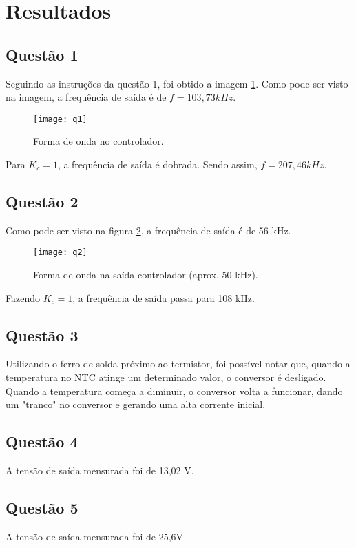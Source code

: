\newpage
\section{Resultados}

\subsection{Questão 1}

Seguindo as instruções da questão 1, foi obtido a imagem \ref{fig:q1}. Como pode ser visto na imagem, a frequência de saída é de $f = 103,73 kHz$.

\begin{figure}[H]
    \centering
    \caption{Forma de onda no controlador.}
    \texttt{[image: q1]}
    \label{fig:q1}
\end{figure}

Para $K_c = 1$, a frequência de saída é dobrada. Sendo assim, $f = 207,46 kHz$.

\subsection{Questão 2}

Como pode ser visto na figura \ref{fig:q2}, a frequência de saída é de 56 kHz.

\begin{figure}[H]
    \centering
    \caption{Forma de onda na saída controlador (aprox. 50 kHz).}
    \texttt{[image: q2]}
    \label{fig:q2}
\end{figure}

Fazendo $K_c = 1$, a frequência de saída passa para 108 kHz.

\subsection{Questão 3}
Utilizando o ferro de solda próximo ao termistor, foi possível notar que, quando a temperatura no NTC atinge um determinado valor, o conversor é desligado. Quando a temperatura começa a diminuir, o conversor volta a funcionar, dando um "tranco" no conversor e gerando uma alta corrente inicial.

\subsection{Questão 4}
 A tensão de saída mensurada foi de 13,02 V.
 
\subsection{Questão 5}
A tensão de saída mensurada foi de 25,6V

